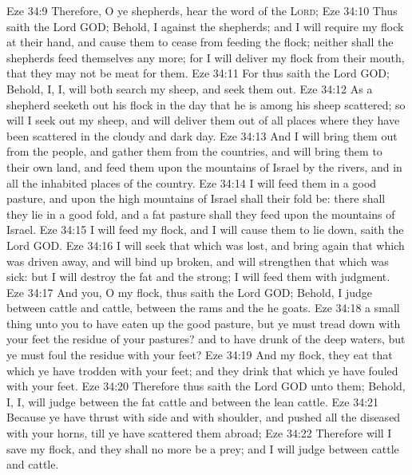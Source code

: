 \vs Eze 34:9 Therefore, O ye shepherds, hear the word of the \textsc{Lord};
\vs Eze 34:10 Thus saith the Lord GOD; Behold, I  against the shepherds; and I will require my flock at their hand, and cause them to cease from feeding the flock; neither shall the shepherds feed themselves any more; for I will deliver my flock from their mouth, that they may not be meat for them.
\vs Eze 34:11 For thus saith the Lord GOD; Behold, I,  I, will both search my sheep, and seek them out.
\vs Eze 34:12 As a shepherd seeketh out his flock in the day that he is among his sheep  scattered; so will I seek out my sheep, and will deliver them out of all places where they have been scattered in the cloudy and dark day.
\vs Eze 34:13 And I will bring them out from the people, and gather them from the countries, and will bring them to their own land, and feed them upon the mountains of Israel by the rivers, and in all the inhabited places of the country.
\vs Eze 34:14 I will feed them in a good pasture, and upon the high mountains of Israel shall their fold be: there shall they lie in a good fold, and  a fat pasture shall they feed upon the mountains of Israel.
\vs Eze 34:15 I will feed my flock, and I will cause them to lie down, saith the Lord GOD.
\vs Eze 34:16 I will seek that which was lost, and bring again that which was driven away, and will bind up  broken, and will strengthen that which was sick: but I will destroy the fat and the strong; I will feed them with judgment.
\vs Eze 34:17 And  you, O my flock, thus saith the Lord GOD; Behold, I judge between cattle and cattle, between the rams and the he goats.
\vs Eze 34:18  a small thing unto you to have eaten up the good pasture, but ye must tread down with your feet the residue of your pastures? and to have drunk of the deep waters, but ye must foul the residue with your feet?
\vs Eze 34:19 And  my flock, they eat that which ye have trodden with your feet; and they drink that which ye have fouled with your feet.
\vs Eze 34:20 Therefore thus saith the Lord GOD unto them; Behold, I,  I, will judge between the fat cattle and between the lean cattle.
\vs Eze 34:21 Because ye have thrust with side and with shoulder, and pushed all the diseased with your horns, till ye have scattered them abroad;
\vs Eze 34:22 Therefore will I save my flock, and they shall no more be a prey; and I will judge between cattle and cattle.
